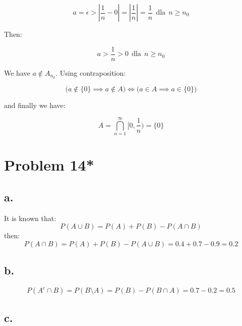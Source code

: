 \documentclass{article}
\begin{document}
\begin{equation*}
    a = \epsilon > |\frac{1}{n} - 0| = |\frac{1}{n}| = \frac{1}{n} \ \ \mbox{dla} \ \ n \geq n_0
\end{equation*}

Then:

\begin{equation*}
    a > \frac{1}{n} > 0 \ \ \mbox{dla} \ \ n \geq n_0
\end{equation*}

We have \(a \notin A_{n_0}\). Using contraposition:

\begin{equation*}
    \Big( a \notin \{0\} \implies a \notin A \Big) \iff \Big( a \in A \implies a \in \{0\} \Big)
\end{equation*}

and finally we have:

\begin{equation*}
    A = \bigcap_{n=1}^{\infty} [0, \frac{1}{n}) = \{ 0 \}
\end{equation*}

\section*{Problem 14*}

\subsection*{a.}

It is known that:
\begin{equation*}
    P(A \cup B) = P(A) + P(B) - P(A \cap B)
\end{equation*}
then:
\begin{equation*}
    P(A \cap B) = P(A) + P(B) - P(A \cup B) = 0.4 + 0.7 - 0.9 = 0.2 
\end{equation*}

\subsection*{b.}

\begin{equation*}
    P(A^{c} \cap B) = P(B \setminus A) = P(B) - P(B \cap A) = 0.7 - 0.2 = 0.5
\end{equation*}

\subsection*{c.}
\end{document}
